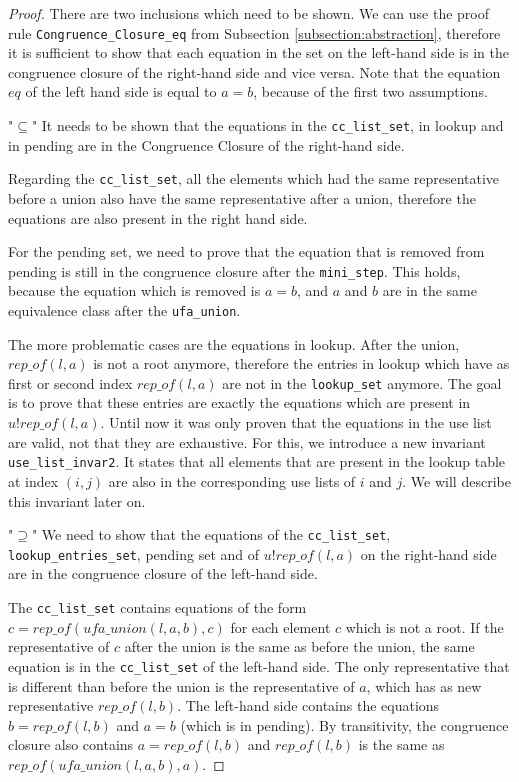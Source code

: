 \begin{proof}
There are two inclusions which need to be shown. We can use the proof rule \lstinline{Congruence_Closure_eq} from Subsection \ref{subsection:abstraction}, therefore it is sufficient to show that each equation in the set on the left-hand side is in the congruence closure of the right-hand side and vice versa. Note that the equation $eq$ of the left hand side is equal to $a = b$, because of the first two assumptions.

"$\subseteq$" It needs to be shown that the equations in the \lstinline{cc_list_set}, in lookup and in pending are in the Congruence Closure of the right-hand side.

Regarding the \lstinline{cc_list_set}, all the elements which had the same representative before a union also have the same representative after a union, therefore the equations are also present in the right hand side.

For the pending set, we need to prove that the equation that is removed from pending is still in the congruence closure after the \lstinline{mini_step}. This holds, because the equation which is removed is $a = b$, and $a$ and $b$ are in the same equivalence class after the \lstinline{ufa_union}.

The more problematic cases are the equations in lookup. After the union, $rep\_of(l, a)$ is not a root anymore, therefore the entries in lookup which have as first or second index $rep\_of(l, a)$ are not in the \lstinline{lookup_set} anymore.
The goal is to prove that these entries are exactly the equations which are present in $u ! rep\_of(l, a)$. Until now it was only proven that the equations in the use list are valid, not that they are exhaustive.
For this, we introduce a new invariant \lstinline{use_list_invar2}.
It states that all elements that are present in the lookup table at index $(i, j)$ are also in the corresponding use lists of $i$ and $j$. We will describe this invariant later on.

"$\supseteq$" We need to show that the equations of the \lstinline{cc_list_set}, \lstinline{lookup_entries_set}, pending set and of $u ! rep\_of(l, a)$ on the right-hand side are in the congruence closure of the left-hand side.

The \lstinline{cc_list_set} contains equations of the form $c = rep\_of (ufa\_union(l, a, b), c)$ for each element $c$ which is not a root.
If the representative of $c$ after the union is the same as before the union, the same equation is in the \lstinline{cc_list_set} of the left-hand side.
The only representative that is different than before the union is the representative of $a$, which has as new representative $rep\_of(l, b)$.
The left-hand side contains the equations $b = rep\_of(l, b)$ and $a = b$ (which is in pending).
By transitivity, the congruence closure also contains $a = rep\_of(l, b)$ and $rep\_of(l, b)$ is the same as $rep\_of (ufa\_union(l, a, b), a)$.


\end{proof}
